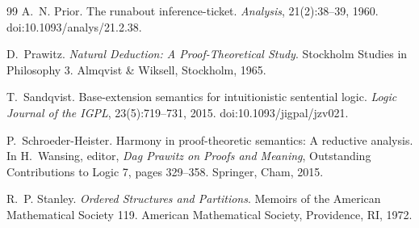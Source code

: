 \documentclass[10pt,a4paper]{article}
\theoremstyle{plain}
\theoremstyle{definition}
\theoremstyle{remark}
\begin{document}
\begin{thebibliography}{99}
A.~N. Prior.
\newblock The runabout inference-ticket.
\newblock \emph{Analysis}, 21(2):38--39, 1960.
\newblock doi:10.1093/analys/21.2.38.

D.~Prawitz.
\newblock \emph{Natural Deduction: A Proof-Theoretical Study}.
\newblock Stockholm Studies in Philosophy 3. Almqvist \& Wiksell,
Stockholm, 1965.

T.~Sandqvist.
\newblock Base-extension semantics for intuitionistic sentential logic.
\newblock \emph{Logic Journal of the IGPL}, 23(5):719--731, 2015.
\newblock doi:10.1093/jigpal/jzv021.

P.~Schroeder-Heister.
\newblock Harmony in proof-theoretic semantics: A reductive analysis.
\newblock In H.~Wansing, editor, \emph{Dag Prawitz on Proofs and Meaning},
Outstanding Contributions to Logic 7, pages 329--358.
Springer, Cham, 2015.

R.~P. Stanley.
\newblock \emph{Ordered Structures and Partitions}.
\newblock Memoirs of the American Mathematical Society 119.
American Mathematical Society, Providence, RI, 1972.

\end{thebibliography}
\end{document}
